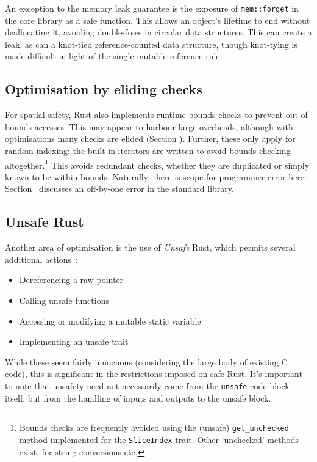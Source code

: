 \documentclass[dissertation.tex]{subfiles}
\begin{document}
An exception to the memory leak guarantee is the exposure of
\texttt{mem::forget} in the core library as a safe function.
This allows an object's lifetime to end without deallocating it,
avoiding double-frees in circular data structures.
This can create a leak, as can a knot-tied reference-counted data
structure, though knot-tying is made difficult in light of the single
mutable reference rule.


\subsection{Optimisation by eliding checks}
\label{sec:rust-elision}

For spatial safety, Rust also implements runtime bounds checks to
prevent out-of-bounds accesses.
This may appear to harbour large overheads, although with optimisations
many checks are elided (Section ).
Further, these only apply for random indexing: the built-in iterators
are written to avoid bounds-checking altogether.\footnote{
Bounds checks are frequently avoided using the (unsafe)
\texttt{get\_unchecked} method implemented for the \texttt{SliceIndex}
trait. Other `unchecked' methods exist, for string conversions etc.}
This avoids redundant checks, whether they are duplicated or simply
known to be within bounds.
Naturally, there is scope for programmer error here:
Section~ discusses an off-by-one error in
the standard library.


\subsection{Unsafe Rust}
\label{sec:rust-unsafe}

Another area of optimisation is the use of \emph{Unsafe} Rust, which
permits several additional actions~\cite{rust-unsafe-powers}:

\begin{itemize}
    \item Dereferencing a raw pointer
    \item Calling unsafe functions
    \item Accessing or modifying a mutable static variable
    \item Implementing an unsafe trait
\end{itemize}

While these seem fairly innocuous (considering the large body of
existing C code), this is significant in the restrictions imposed on
safe Rust.
It's important to note that unsafety need not necessarily come from
the \texttt{unsafe} code block itself, but from the handling of inputs
and outputs to the unsafe block.
\end{document}
